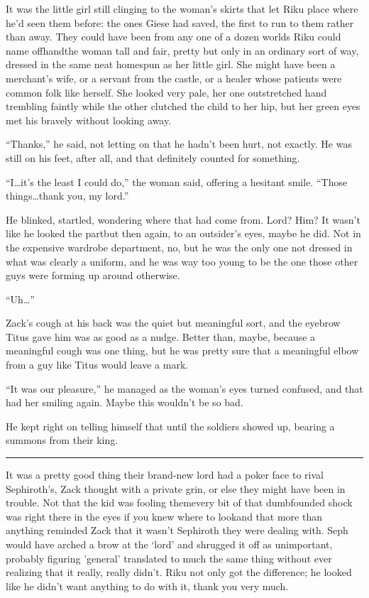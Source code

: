 It was the little girl still clinging to the woman's skirts that let Riku place where he'd seen them before: the ones Giese had saved, the first to run to them rather than away. They could have been from any one of a dozen worlds Riku could name offhand\textemdash the woman tall and fair, pretty but only in an ordinary sort of way, dressed in the same neat homespun as her little girl. She might have been a merchant's wife, or a servant from the castle, or a healer whose patients were common folk like herself. She looked very pale, her one outstretched hand trembling faintly while the other clutched the child to her hip, but her green eyes met his bravely without looking away.

``Thanks,'' he said, not letting on that he hadn't been hurt, not exactly. He was still on his feet, after all, and that definitely counted for something.

``I\ldots it's the least I could do,'' the woman said, offering a hesitant smile. ``Those things\ldots thank you, my lord.''

He blinked, startled, wondering where that had come from. Lord? Him? It wasn't like he looked the part\textemdash but then again, to an outsider's eyes, maybe he did. Not in the expensive wardrobe department, no, but he was the only one not dressed in what was clearly a uniform, and he was way too young to be the one those other guys were forming up around otherwise.

``Uh\ldots ''

Zack's cough at his back was the quiet but meaningful sort, and the eyebrow Titus gave him was as good as a nudge. Better than, maybe, because a meaningful cough was one thing, but he was pretty sure that a meaningful elbow from a guy like Titus would leave a mark.

``It was our pleasure,'' he managed as the woman's eyes turned confused, and that had her smiling again. Maybe this wouldn't be so bad.

He kept right on telling himself that until the soldiers showed up, bearing a summons from their king.

\fancybreak{\pfbreakdisplay}


It was a pretty good thing their brand-new lord had a poker face to rival Sephiroth's, Zack thought with a private grin, or else they might have been in trouble. Not that the kid was fooling them\textemdash every bit of that dumbfounded shock was right there in the eyes if you knew where to look\textemdash and that more than anything reminded Zack that it wasn't Sephiroth they were dealing with. Seph would have arched a brow at the `lord' and shrugged it off as unimportant, probably figuring 'general' translated to much the same thing without ever realizing that it really, really didn't. Riku not only got the difference; he looked like he didn't want anything to do with it, thank you very much.

